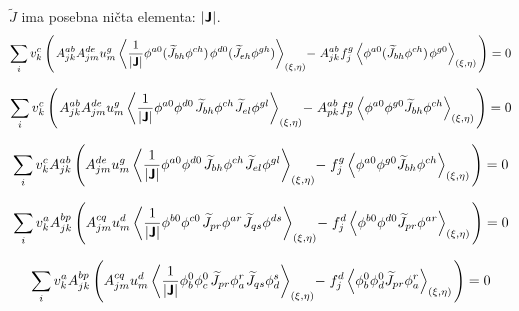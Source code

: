 $\widetilde{J}$ ima posebna ničta elementa: $|\bm{\mathsf{J}}|$.
\begin{equation}
   \sum_i v^c_k \left( \mkern2mu A^{ab}_{jk} A^{de}_{jm} u^g_m \left\langle \frac{1}{|\bm{\mathsf{J}}|} \phi^{a0} (\widetilde{J}_{bh}  \phi^{ch}) \mkern1mu\mkern1mu \phi^{d0} (\widetilde{J}_{eh}  \phi^{gh}) \right\rangle_{(\xi, \eta)} \mkern-4mu - \mkern1mu A^{ab}_{jk} \mkern1mu f^g_j \left\langle\phi^{a0} (\widetilde{J}_{bh}  \phi^{ch}) \mkern1mu \mkern1mu \phi^{g0} \right\rangle_{(\xi, \eta)} \mkern2mu \right) = 0
\end{equation}

\begin{equation}
   \sum_i v^c_k \left( \mkern2mu A^{ab}_{jk} A^{de}_{jm} u^g_m \left\langle \frac{1}{|\bm{\mathsf{J}}|} \phi^{a0} \phi^{d0} \mkern2mu \widetilde{J}_{bh}  \phi^{ch} \mkern1mu \widetilde{J}_{el}  \phi^{gl} \right\rangle_{(\xi, \eta)} \mkern-4mu - \mkern1mu A^{ab}_{pk} \mkern1mu f^g_p \left\langle\phi^{a0} \phi^{g0} \widetilde{J}_{bh}  \phi^{ch} \right\rangle_{(\xi, \eta)} \mkern2mu \right) = 0
\end{equation}

\begin{equation}
   \sum_i v^c_k A^{ab}_{jk} \left(A^{de}_{jm} u^g_m \left\langle \frac{1}{|\bm{\mathsf{J}}|} \phi^{a0} \phi^{d0} \mkern2mu \widetilde{J}_{bh}  \phi^{ch} \mkern1mu \widetilde{J}_{el}  \phi^{gl} \right\rangle_{(\xi, \eta)} \mkern-4mu - \mkern1mu f^g_j \left\langle\phi^{a0} \phi^{g0} \widetilde{J}_{bh}  \phi^{ch} \right\rangle_{(\xi, \eta)} \mkern2mu \right) = 0
\end{equation}

\begin{equation}
   \sum_i v^a_k A^{bp}_{jk} \left(A^{cq}_{jm} u^d_m \left\langle \frac{1}{|\bm{\mathsf{J}}|} \phi^{b0} \phi^{c0} \mkern2mu \widetilde{J}_{pr}  \phi^{ar} \mkern1mu \widetilde{J}_{qs}  \phi^{ds} \right\rangle_{(\xi, \eta)} \mkern-4mu - \mkern1mu f^d_j \left\langle\phi^{b0} \phi^{d0} \widetilde{J}_{pr}  \phi^{ar} \right\rangle_{(\xi, \eta)} \mkern2mu \right) = 0
\end{equation}

\begin{equation}
   \sum_i v^a_k A^{bp}_{jk} \left(A^{cq}_{jm} u^d_m \left\langle \frac{1}{|\bm{\mathsf{J}}|} \phi^0_b \phi^0_c \mkern2mu \widetilde{J}_{pr}  \phi^r_a \mkern1mu \widetilde{J}_{qs}  \phi^s_d \right\rangle_{(\xi, \eta)} \mkern-4mu - \mkern1mu f^d_j \left\langle\phi^0_b \phi^0_d \widetilde{J}_{pr}  \phi^r_a \right\rangle_{(\xi, \eta)} \mkern2mu \right) = 0
\end{equation}

